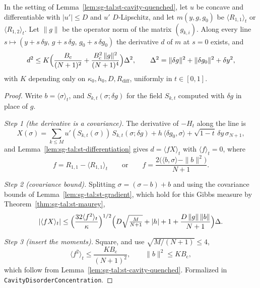 \begin{lemma}\label{lem:sg-tal:st-cavity-gradient}
  \leanok
In the setting of Lemma~\ref{lem:sg-tal:st-cavity-quenched}, let $u$ be concave and differentiable with
$|u'|\le D$ and $u'$ $D$-Lipschitz, and let $m(y,g,g_0)$ be $\langle R_{1,1}\rangle_t$ or
$\langle R_{1,2}\rangle_t$. Let $\|g\|$ be the operator norm of the matrix $(g_{k,i})$. Along every line
$s\mapsto(y+s\,\delta y,\,g+s\,\delta g,\,g_0+s\,\delta g_0)$ the derivative $d$ of $m$ at $s=0$ exists, and
\[
d^2\le K\Bigl(\frac{B_{\mathrm c}}{(N+1)^2}+\frac{B_{\mathrm c}^2\,\|g\|^2}{(N+1)^4}\Bigr)\Delta^2,\qquad
\Delta^2=\|\delta g\|^2+\|\delta g_0\|^2+\delta y^2,
\]
with $K$ depending only on $\kappa_0,h_0,D,R_{\mathrm{diff}}$, uniformly in $t\in[0,1]$.
\end{lemma}
\begin{proof}
  \leanok
Write $b=\langle\sigma\rangle_t$, and $S_{k,t}(\sigma;\delta g)$ for the field $S_{k,t}$ computed with $\delta g$
in place of $g$.

\emph{Step 1 (the derivative is a covariance).} The derivative of $-H_t$ along the line is
\[
X(\sigma)=\sum_{k\le M}u'(S_{k,t}(\sigma))\,S_{k,t}(\sigma;\delta g)+h\,\langle\delta g_0,\sigma\rangle
+\sqrt{1-t}\,\delta y\,\sigma_{N+1},
\]
and Lemma~\ref{lem:sg-tal:st-differentiation} gives $d=\langle fX\rangle_t$ with $\langle f\rangle_t=0$, where
\[
f=R_{1,1}-\langle R_{1,1}\rangle_t\qquad\text{or}\qquad f=\frac{2\bigl(\langle b,\sigma\rangle-\|b\|^2\bigr)}{N+1}.
\]

\emph{Step 2 (covariance bound).} Splitting $\sigma=(\sigma-b)+b$ and using the covariance bounds of
Lemma~\ref{lem:sg-tal:st-gradient}, which hold for this Gibbs measure by Theorem~\ref{thm:sg-tal:st-maurey},
\[
|\langle fX\rangle_t|\le\Bigl(\frac{32\langle f^2\rangle_t}\kappa\Bigr)^{1/2}
\Bigl(D\sqrt{\tfrac M{N+1}}+|h|+1+\frac{D\,\|g\|\,\|b\|}{N+1}\Bigr)\Delta .
\]

\emph{Step 3 (insert the moments).} Square, and use $\sqrt{M/(N+1)}\le4$,
\[
\langle f^2\rangle_t\le\frac{KB_{\mathrm c}}{(N+1)^2},\qquad\|b\|^2\le KB_{\mathrm c},
\]
which follow from Lemma~\ref{lem:sg-tal:st-cavity-quenched}.
Formalized in \texttt{CavityDisorderConcentration}.
\end{proof}

